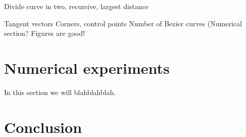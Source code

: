\documentclass[10pt]{article}
\begin{document}
Divide curve in two, recursive, largest distance

Tangent vectors
Corners, control points
Number of Bezier curves (Numerical section?
Figures are good!


\section{Numerical experiments}

In this section we will blahblahblah. 



\section{Conclusion}
\cite{Plass:1983}


\end{document}
